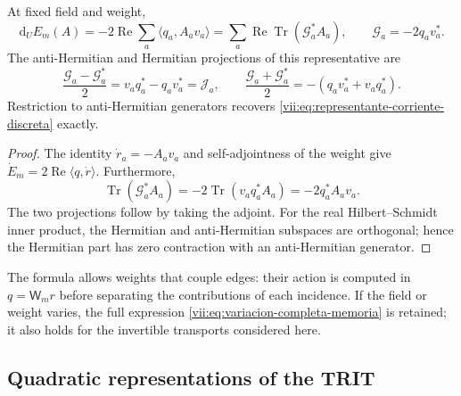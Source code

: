 \begin{proposition}
\label{vii:prop:diferencial-invertible}
At fixed field and weight,
\begin{equation}
 \mathrm d_UE_m(A)=-2\operatorname{Re}\sum_a
       \langle q_a,A_av_a\rangle
 =\sum_a\operatorname{Re}\operatorname{Tr}(\mathcal G_a^*A_a),
 \qquad \mathcal G_a=-2q_av_a^*.
 \label{vii:eq:gradiente-transporte-completo}
\end{equation}
The anti-Hermitian and Hermitian projections of this representative are
\begin{equation}
 \frac{\mathcal G_a-\mathcal G_a^*}{2}
   =v_aq_a^*-q_av_a^*=\mathcal J_a,
 \qquad
 \frac{\mathcal G_a+\mathcal G_a^*}{2}
   =-(q_av_a^*+v_aq_a^*).
 \label{vii:eq:proyecciones-gradiente-memoria}
\end{equation}
Restriction to anti-Hermitian generators recovers
\eqref{vii:eq:representante-corriente-discreta} exactly.
\end{proposition}

\begin{proof}
The identity \(\dot r_a=-A_av_a\) and self-adjointness of the weight give
\(\dot E_m=2\operatorname{Re}\langle q,\dot r\rangle\).
Furthermore,
\[
 \operatorname{Tr}(\mathcal G_a^*A_a)
 =-2\operatorname{Tr}(v_aq_a^*A_a)=-2q_a^*A_av_a.
\]
The two projections follow by taking the adjoint. For the real
Hilbert--Schmidt inner product, the Hermitian and anti-Hermitian
subspaces are orthogonal; hence the Hermitian part has zero contraction
with an anti-Hermitian generator.
\end{proof}

The formula allows weights that couple edges: their action is computed
in \(q=\mathsf W_mr\) before separating the contributions of each
incidence. If the field or weight varies, the full expression
\eqref{vii:eq:variacion-completa-memoria} is retained; it also holds
for the invertible transports considered here.

\subsection{Quadratic representations of the TRIT}

